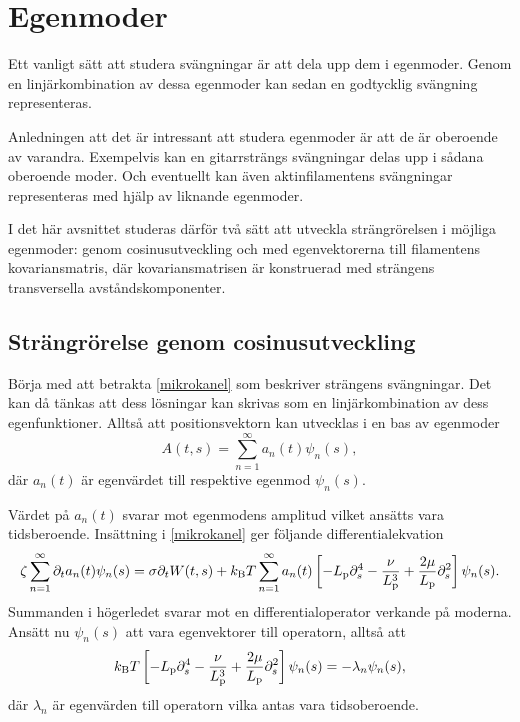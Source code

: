 \section{Egenmoder}
Ett vanligt sätt att studera svängningar är att dela upp dem i egenmoder. Genom en linjärkombination av dessa egenmoder kan sedan en godtycklig svängning representeras. 

Anledningen att det är intressant att studera egenmoder är att de är oberoende av varandra. Exempelvis kan en gitarrsträngs svängningar delas upp i sådana oberoende moder. Och eventuellt kan även aktinfilamentens svängningar representeras med hjälp av liknande egenmoder. 

I det här avsnittet studeras därför två sätt att utveckla strängrörelsen i möjliga egenmoder: genom cosinusutveckling och med egenvektorerna till filamentens kovariansmatris, där kovariansmatrisen är konstruerad med strängens transversella avståndskomponenter. 


\subsection{Strängrörelse genom cosinusutveckling} \label{sec:costransform}
Börja med att betrakta \eqref{mikrokanel} som beskriver strängens svängningar. Det kan då tänkas att dess lösningar kan skrivas som en linjärkombination av dess egenfunktioner. Alltså att positionsvektorn kan utvecklas i en bas av egenmoder
\begin{equation}
\label{basutv}
    A(t,s)=\sum_{n=1}^{\infty}a_{n}(t)\psi_{n}(s),
\end{equation}
där $a_{n}(t)$ är egenvärdet till respektive egenmod $\psi_{n}(s)$. 

Värdet på $a_{n}(t)$ svarar mot egenmodens amplitud vilket ansätts vara tidsberoende. Insättning i \eqref{mikrokanel} ger följande differentialekvation 
\begin{equation}\label{egenvard}
\zeta\sum_{n=1}^{\infty}\partial_{t}a_{n}(t)\psi_{n}(s)
= \sigma\partial_{t}W(t,s) +
k_{\text{B}}T\sum_{n=1}^{\infty}
a_{n}(t) \left[
-L_{\text{p}}\partial_{s}^{4}
-\frac{\nu}{L_{\text{p}}^{3}}
+\frac{2\mu}{L_{\text{p}}}\partial_{s}^{2}
\right]\psi_{n}(s).
\end{equation}
Summanden i högerledet svarar mot en differentialoperator verkande på moderna. Ansätt nu $\psi_{n}(s)$ att vara egenvektorer till operatorn, alltså att
\begin{equation}
    k_{\text{B}}T\left[-L_{\text{p}}\partial_{s}^{4}-\frac{\nu}{L_{\text{p}}^{3}}
+\frac{2\mu}{L_{\text{p}}}\partial_{s}^{2}\right]\psi_{n}(s)=-\lambda_{n}\psi_{n}(s),
\end{equation}
där $\lambda_{n}$ är egenvärden till operatorn vilka antas vara tidsoberoende.

